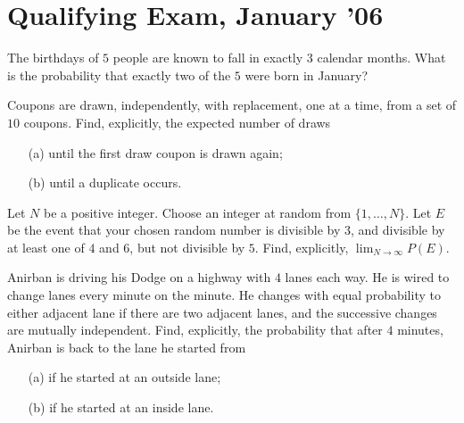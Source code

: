 \section{Qualifying Exam, January '06}
\begin{problem}
  The birthdays of \(5\) people are known to fall in exactly \(3\) calendar
  months. What is the probability that exactly two of the \(5\) were born
  in January?
\end{problem}
\begin{solution}
\end{solution}

\begin{problem}
  Coupons are drawn, independently, with replacement, one at a time, from a
  set of \(10\) coupons. Find, explicitly, the expected number of draws
  \begin{itemize}[noitemsep]
  \item[(a)] until the first draw coupon is drawn again;
  \item[(b)] until a duplicate occurs.
  \end{itemize}
\end{problem}
\begin{solution}
\end{solution}

\begin{problem}
  Let \(N\) be a positive integer. Choose an integer at random from
  \(\{1,\dotsc,N\}\). Let \(E\) be the event that your chosen random number
  is divisible by \(3\), and divisible by at least one of \(4\) and \(6\),
  but not divisible by \(5\). Find, explicitly, \(\lim_{N\to\infty}P(E)\).
\end{problem}
\begin{solution}
\end{solution}

\begin{problem}
  Anirban is driving his Dodge on a highway with \(4\) lanes each way. He
  is wired to change lanes every minute on the minute. He changes with
  equal probability to either adjacent lane if there are two adjacent
  lanes, and the successive changes are mutually independent. Find,
  explicitly, the probability that after \(4\) minutes, Anirban is back to
  the lane he started from
  \begin{itemize}[noitemsep]
  \item[(a)] if he started at an outside lane;
  \item[(b)] if he started at an inside lane.
  \end{itemize}
\end{problem}
\begin{solution}
\end{solution}

